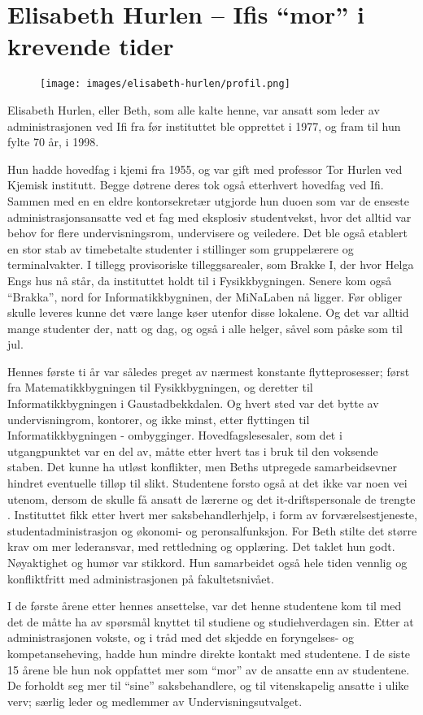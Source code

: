 \chapter[Elisabeth Hurlen]{Elisabeth Hurlen – Ifis ``mor'' i krevende tider}

\author{Skrevet av Narve Trædal}

\begin{figure}
	\texttt{[image: images/elisabeth-hurlen/profil.png]}
	\label{fig:elisabeth-hurlen}
\end{figure}

Elisabeth Hurlen, eller Beth, som alle kalte henne, var ansatt som leder av administrasjonen ved Ifi fra før instituttet ble opprettet i 1977, og fram til hun fylte 70 år, i 1998.

Hun hadde hovedfag i kjemi fra 1955, og var gift med professor Tor Hurlen ved Kjemisk institutt. Begge døtrene deres tok også etterhvert hovedfag ved Ifi. Sammen med en en eldre kontorsekretær utgjorde hun duoen som var de enseste administrasjonsansatte ved et fag med eksplosiv studentvekst, hvor det alltid var behov for flere undervisningsrom, undervisere og veiledere. Det ble også etablert en stor stab av timebetalte studenter i stillinger som gruppelærere og terminalvakter. I tillegg provisoriske tilleggsarealer, som Brakke I, der hvor Helga Engs hus nå står, da instituttet holdt til i Fysikkbygningen. Senere kom også ``Brakka'', nord for Informatikkbygninen, der MiNaLaben nå ligger. Før obliger skulle leveres kunne det være lange køer utenfor disse lokalene. Og det var alltid mange studenter der, natt og dag, og også i alle helger, såvel som påske som til jul.

Hennes første ti år var således preget av nærmest konstante flytteprosesser; først fra Matematikkbygningen til Fysikkbygningen, og deretter til Informatikkbygningen i Gaustadbekkdalen. Og hvert sted var det bytte av undervisningrom, kontorer, og ikke minst, etter flyttingen til Informatikkbygningen - ombygginger. Hovedfagslesesaler, som det i utgangpunktet var en del av, måtte etter hvert tas i bruk til den voksende staben. Det kunne ha utløst konflikter, men Beths utpregede samarbeidsevner hindret eventuelle tilløp til slikt. Studentene forsto også at det ikke var noen vei utenom, dersom de skulle få ansatt de lærerne og det it-driftspersonale de trengte . Instituttet fikk etter hvert mer saksbehandlerhjelp, i form av forværelsestjeneste, studentadministrasjon og økonomi- og peronsalfunksjon. For Beth stilte det større krav om mer lederansvar, med rettledning og opplæring. Det taklet hun godt. Nøyaktighet og humør var stikkord. Hun samarbeidet også hele tiden vennlig og konfliktfritt med administrasjonen på fakultetsnivået.

I de første årene etter hennes ansettelse, var det henne studentene kom til med det de måtte ha av spørsmål knyttet til studiene og studiehverdagen sin. Etter at administrasjonen vokste, og i tråd med det skjedde en foryngelses- og kompetanseheving, hadde hun mindre direkte kontakt med studentene. I de siste 15 årene ble hun nok oppfattet mer som ``mor'' av de ansatte enn av studentene. De forholdt seg mer til ``sine'' saksbehandlere, og til vitenskapelig ansatte i ulike verv; særlig leder og medlemmer av Undervisningsutvalget.
